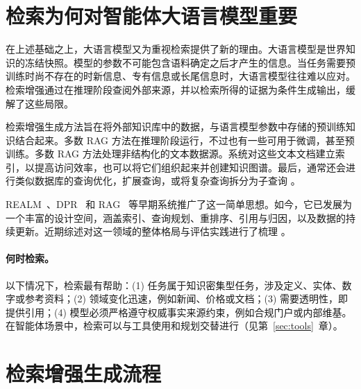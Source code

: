 \section{检索为何对智能体大语言模型重要}
在上述基础之上，大语言模型又为重视检索提供了新的理由。大语言模型是世界知识的冻结快照。模型的参数不可能包含语料确定之后才产生的信息。当任务需要预训练时尚不存在的时新信息、专有信息或长尾信息时，大语言模型往往难以应对。检索增强通过在推理阶段查阅外部来源，并以检索所得的证据为条件生成输出，缓解了这些局限。

检索增强生成方法旨在将外部知识库中的数据，与语言模型参数中存储的预训练知识结合起来。多数 RAG 方法在推理阶段运行，不过也有一些可用于微调，甚至预训练。多数 RAG 方法处理非结构化的文本数据源。系统对这些文本文档建立索引，以提高访问效率，也可以将它们组织起来并创建知识图谱。最后，通常还会进行类似数据库的查询优化，扩展查询，或将复杂查询拆分为子查询 \citep{cong2024query}。

REALM~\citep{guu2020realm}、DPR~\citep{karpukhin2020dense} 和 RAG~\citep{lewis2020retrieval} 等早期系统推广了这一简单思想。如今，它已发展为一个丰富的设计空间，涵盖索引、查询规划、重排序、引用与归因，以及数据的持续更新。近期综述对这一领域的整体格局与评估实践进行了梳理 \citep{gao2023rag_survey,huang2024rag_survey,yu2024rag_eval,sharma2025rag_survey,peng2024graphrag_survey}。




\paragraph{何时检索。} 以下情况下，检索最有帮助：(1) 任务属于知识密集型任务，涉及定义、实体、数字或参考资料；(2) 领域变化迅速，例如新闻、价格或文档；(3) 需要透明性，即提供引用；(4) 模型必须严格遵守权威事实来源约束，例如合规门户或内部维基。在智能体场景中，检索可以与工具使用和规划交替进行（见第~\ref{sec:tools}~章）。

\section{检索增强生成流程}
\label{sec:rag-pipeline}

